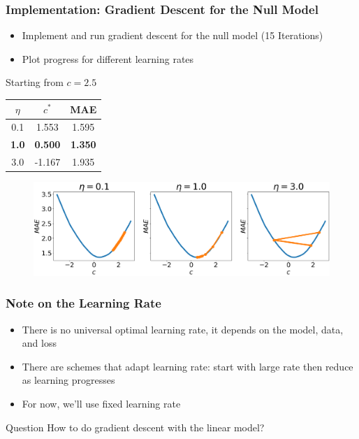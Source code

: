 \documentclass{beamer}
\begin{document}
\begin{frame}
\frametitle{Implementation: Gradient Descent for the Null Model}

\begin{itemize}
\item Implement and run gradient descent for the null model (15 Iterations)
\item Plot progress for different learning rates
\end{itemize}


\centering
Starting from $c = 2.5$

\begin{tabular}{|c|c|c|}
\hline 
$\eta$ & $c^{*}$ & MAE\tabularnewline
\hline 
\hline 
0.1 & 1.553 & 1.595\tabularnewline
\hline 
\textbf{1.0} & \textbf{0.500} & \textbf{1.350}\tabularnewline
\hline 
3.0 & -1.167 & 1.935\tabularnewline
\hline 
\end{tabular}

\begin{figure}
\includegraphics[width=\textwidth]{../figures/null_gd_steps.png}
\end{figure}

\end{frame}

\begin{frame}
\frametitle{Note on the Learning Rate}

\begin{block}

\begin{itemize}
\item There is no universal optimal learning rate, it depends on the model, data, and loss
\item There are schemes that adapt learning rate: start with large rate then reduce as learning progresses
\item For now, we'll use fixed learning rate
\end{itemize}

\end{block}

\begin{alertblock}{Question}
How to do gradient descent with the linear model?
\end{alertblock}

\end{frame}
\end{document}
